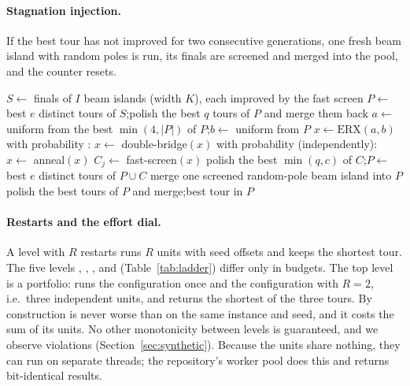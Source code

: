 \paragraph{Stagnation injection.}
If the best tour has not improved for two consecutive generations, one fresh beam island with random
poles is run, its finals are screened and merged into the pool, and the counter resets.

\begin{algorithm}[t]
\caption{One BGMA unit. All random choices come from a generator seeded by (instance, seed).}
\label{alg:unit}
\begin{algorithmic}[1]
\State $S\gets$ finals of $I$ beam islands (width $K$), each improved by the fast screen
\State $P\gets$ best $e$ distinct tours of $S$;\quad polish the best $q$ tours of $P$ and merge them back
    \State $a\gets$ uniform from the best $\min(4,|P|)$ of $P$;\quad $b\gets$ uniform from $P$
    \State $x\gets \mathrm{ERX}(a,b)$
    \State with probability : $x\gets$ double-bridge$(x)$
    \State with probability  (independently): $x\gets$ anneal$(x)$
    \State $C_j\gets$ fast-screen$(x)$
  \EndFor
  \State polish the best $\min(q,c)$ of $C$;\quad $P\gets$ best $e$ distinct tours of $P\cup C$
   merge one screened random-pole beam island into $P$ \EndIf
\EndFor
\State polish the best  tours of $P$ and merge;\quad \Return best tour in $P$
\end{algorithmic}
\end{algorithm}

\paragraph{Restarts and the effort dial.}
A level with $R$ restarts runs $R$ units with seed offsets and keeps the shortest tour. The five levels
, , ,  and  (Table~\ref{tab:ladder}) differ only in
budgets. The top level is a portfolio:  runs the  configuration once and the
 configuration with $R=2$, i.e.\ three independent units, and returns the shortest of the three
tours. By construction  is never worse than  on the same instance and seed, and it
costs the sum of its units. No other monotonicity between levels is guaranteed, and we observe
violations (Section~\ref{sec:synthetic}). Because the units share nothing, they can run on separate
threads; the repository's worker pool does this and returns bit-identical results.

